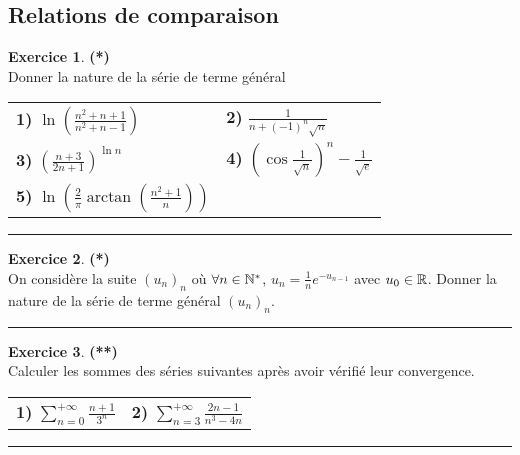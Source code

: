 \documentclass[a4paper,11pt]{article}
\theoremstyle{definition}
\newtheorem{exo}{Exercice} %
\newcommand{\disp}{\displaystyle}
\begin{document}
   
\begin{minipage}{1\linewidth}\begin{minipage}[t]{0.48\linewidth}\raggedright

\subsection*{Relations de comparaison}

\begin{exo}\textbf{(*)}\quad\\[0.2cm]
Donner la nature de la série de terme général 

\begin{center}
	\begin{tabular}{ll}
		\textbf{1) }$\disp \ln\left(\frac{n^2+n+1}{n^2+n-1}\right)$&\textbf{2) }  $\disp\frac{1}{n+(-1)^n\sqrt{n}}$\\[0.5cm]
		\textbf{3) } $\disp\left(\frac{n+3}{2n+1}\right)^{\ln n}$  &\textbf{4) } $\disp\left(\cos\frac{1}{\sqrt{n}}\right)^n-\frac{1}{\sqrt{e}}$\\[0.35cm]
		\textbf{5) } $\disp\ln\left(\frac{2}{\pi}\arctan\left(\frac{n^2+1}{n}\right)\right)$&
	\end{tabular}
\end{center}


	
\centering\rule{1\linewidth}{0.6pt}\end{exo}



\begin{exo}\textbf{(*)}\quad\\[0.2cm]
On considère la suite $(u_n)_n$ où $\forall n\in\mathbb{N}^*$, $\disp u_n=\frac{1}{n}e^{-u_{n-1}}$ avec $u_0\in\mathbb{R}$. Donner la nature de la série de terme général $(u_n)_n$.

	\centering\rule{1\linewidth}{0.6pt}\end{exo}

\begin{exo}\textbf{(**)}\quad\\[0.2cm]
Calculer les sommes des séries suivantes après avoir vérifié leur convergence.
\begin{center}
	\begin{tabular}{ll}
		\textbf{1) } $\disp\sum_{n=0}^{+\infty}\frac{n+1}{3^n}$&\textbf{2) } $\disp\sum_{n=3}^{+\infty}\frac{2n-1}{n^3-4n}$
	\end{tabular}
\end{center}	
	\centering\rule{1\linewidth}{0.6pt}\end{exo}





\end{minipage}
\end{minipage}
\end{document}
